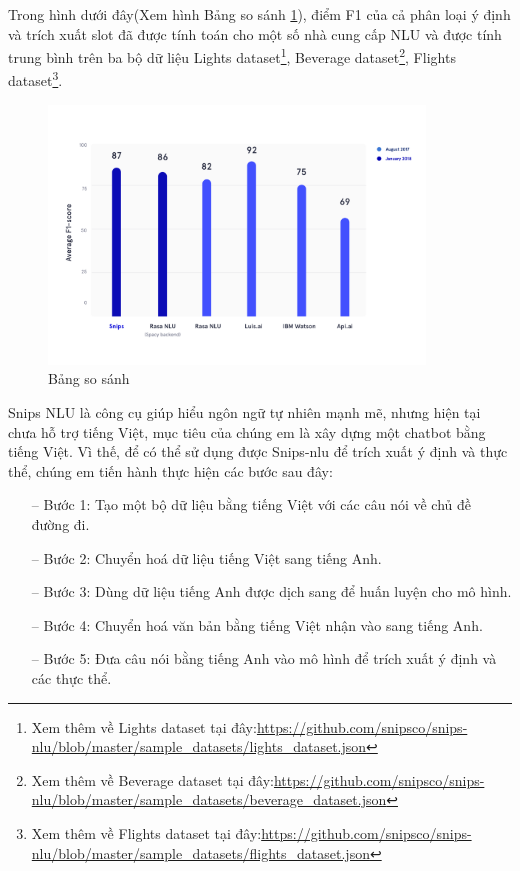 Trong hình dưới đây(Xem hình Bảng so sánh \ref{fig:benchmarks}), điểm F1 của cả phân loại ý định và trích xuất slot đã được tính toán cho một số nhà cung cấp NLU và được tính trung bình trên ba bộ dữ liệu Lights dataset\footnote{Xem thêm về Lights dataset tại đây:\url{https://github.com/snipsco/snips-nlu/blob/master/sample_datasets/lights_dataset.json}}, Beverage dataset\footnote{Xem thêm về Beverage dataset tại đây:\url{https://github.com/snipsco/snips-nlu/blob/master/sample_datasets/beverage_dataset.json}}, Flights dataset\footnote{Xem thêm về Flights dataset tại đây:\url{https://github.com/snipsco/snips-nlu/blob/master/sample_datasets/flights_dataset.json}}.

\begin{figure}[htp]
    \centering
    \includegraphics[width=10cm]{images/benchmarks.png}
    \caption{Bảng so sánh}
    \label{fig:benchmarks}
\end{figure}

Snips NLU là công cụ giúp hiểu ngôn ngữ tự nhiên mạnh mẽ, nhưng hiện tại chưa hỗ trợ tiếng Việt, mục tiêu của chúng em là xây dựng một chatbot bằng tiếng Việt. Vì thế, để có thể sử dụng được Snips-nlu để trích xuất ý định và thực thể, chúng em tiến hành thực hiện các bước sau đây:
\begin{itemize}
    \item[--] Bước 1: Tạo một bộ dữ liệu bằng tiếng Việt với các câu nói về chủ đề đường đi.
    \item[--] Bước 2: Chuyển hoá dữ liệu tiếng Việt sang tiếng Anh.
    \item[--] Bước 3: Dùng dữ liệu tiếng Anh được dịch sang để huấn luyện cho mô hình.
    \item[--] Bước 4: Chuyển hoá văn bản bằng tiếng Việt nhận vào sang tiếng Anh.
    \item[--] Bước 5: Đưa câu nói bằng tiếng Anh vào mô hình để trích xuất ý định và các thực thể.
\end{itemize}

